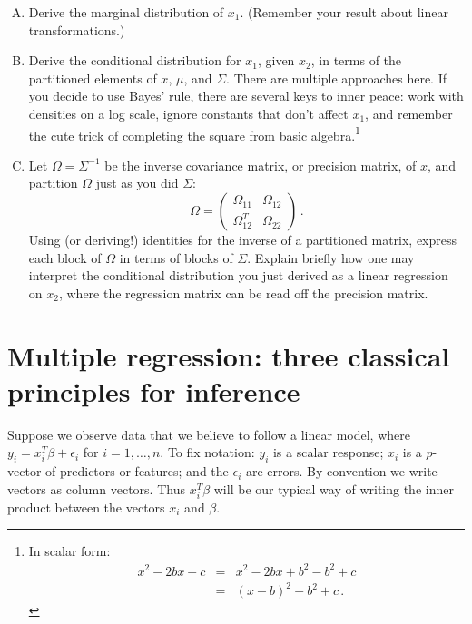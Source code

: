\documentclass{mynotes}
\begin{document}
\begin{enumerate}[(A)]

\item Derive the marginal distribution of $x_1$. (Remember your result about linear transformations.)

\item Derive the conditional distribution for $x_1$, given $x_2$, in terms of the partitioned elements of $x$, $\mu$, and $\Sigma$.  There are multiple approaches here.  If you decide to use Bayes' rule, there are several keys to inner peace: work with densities on a log scale, ignore constants that don't affect $x_1$, and remember the cute trick of completing the square from basic algebra.\footnote{In scalar form:
\begin{eqnarray*}
x^2 - 2bx + c &=& x^2 - 2bx + b^2 - b^2 + c \\
&=& (x-b)^2 - b^2 + c \, .
\end{eqnarray*}
}

\item Let $\Omega = \Sigma^{-1}$ be the inverse covariance matrix, or precision matrix, of $x$, and partition $\Omega$ just as you did $\Sigma$:
$$
\Omega =
\left(
\begin{array}{cc}
\Omega_{11} & \Omega_{12} \\
\Omega_{12}^T & \Omega_{22} 
\end{array}
\right) \, .
$$
Using (or deriving!) identities for the inverse of a partitioned matrix, express each block of $\Omega$ in terms of blocks of $\Sigma$.  Explain briefly how one may interpret the conditional distribution you just derived as a linear regression on $x_2$, where the regression matrix can be read off the precision matrix.

\end{enumerate}

\newpage

\section{Multiple regression: three classical principles for inference}

Suppose we observe data that we believe to follow a linear model, where $y_i = x_i^T \beta + \epsilon_i$ for $i = 1, \ldots, n$.
To fix notation: $y_i$ is a scalar response; $x_i$ is a $p$-vector of predictors or features; and the $\epsilon_i$ are errors.  By convention we write vectors as column vectors.  Thus $x_i^T \beta$ will be our typical way of writing the inner product between the vectors $x_i$ and $\beta$.
\end{document}
